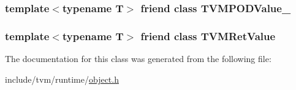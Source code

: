 \subsubsection[{\texorpdfstring{T\+V\+M\+P\+O\+D\+Value\+\_\+}{TVMPODValue_}}]{\setlength{\rightskip}{0pt plus 5cm}template$<$typename T$>$ friend class {\bf T\+V\+M\+P\+O\+D\+Value\+\_\+}\hspace{0.3cm}{\ttfamily [friend]}}\hypertarget{classtvm_1_1runtime_1_1ObjectPtr_a9a9fd94393cfd7d4b6e6029348e3e19a}{}\label{classtvm_1_1runtime_1_1ObjectPtr_a9a9fd94393cfd7d4b6e6029348e3e19a}
\subsubsection[{\texorpdfstring{T\+V\+M\+Ret\+Value}{TVMRetValue}}]{\setlength{\rightskip}{0pt plus 5cm}template$<$typename T$>$ friend class {\bf T\+V\+M\+Ret\+Value}\hspace{0.3cm}{\ttfamily [friend]}}\hypertarget{classtvm_1_1runtime_1_1ObjectPtr_ae0ea8b4adc6dab8c74086bceaef6b3e1}{}\label{classtvm_1_1runtime_1_1ObjectPtr_ae0ea8b4adc6dab8c74086bceaef6b3e1}


The documentation for this class was generated from the following file\+:\begin{DoxyCompactItemize}
\item 
include/tvm/runtime/\hyperlink{object_8h}{object.\+h}\end{DoxyCompactItemize}
